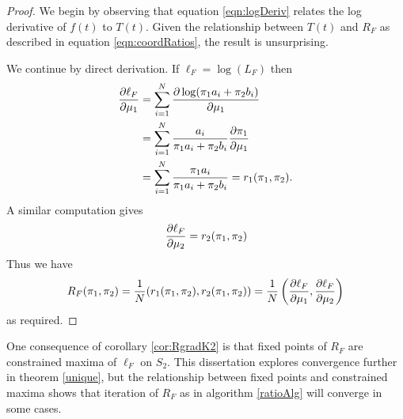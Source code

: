 \begin{proof}
	We begin by observing that equation \eqref{eqn:logDeriv} relates the log derivative of \( f(t) \) to \( T(t) \).  Given the relationship between \( T(t) \) and \( R_F \) as described in equation \eqref{eqn:coordRatios}, the result is unsurprising.
	
	We continue by direct derivation. If \( \ell_F = \log(L_F) \) then 
	\begin{align}\label{eqn:ellDeriv}
		\pdv{\ell_F}{\mu_1} &= \sum_{i=1}^{N} \pdv{\log(\pi_1a_i+\pi_2b_i)}{\mu_1}\nonumber \\
							&= \sum_{i=1}^{N} \frac{a_i}{\pi_1a_i+\pi_2b_i}\pdv{\pi_1}{\mu_1} \\
							&= \sum_{i=1}^{N} \frac{\pi_1a_i}{\pi_1a_i+\pi_2b_i} = r_1(\pi_1,\pi_2).\nonumber
	\end{align}
	A similar computation gives 
	\[\pdv{\ell_F}{\mu_2} = r_2(\pi_1,\pi_2)\]
	Thus we have 
	\begin{equation}\label{eqn:RgradK2}
		R_F(\pi_1,\pi_2) = \frac 1N (r_1(\pi_1,\pi_2),r_2(\pi_1,\pi_2)) = \frac 1N \left(\pdv{\ell_F}{\mu_1} ,\pdv{\ell_F}{\mu_2} \right)
	\end{equation}
	as required.
\end{proof}

One consequence of corollary \ref{cor:RgradK2} is that fixed points of \( R_F \) are constrained maxima of \( \ell_F \) on \(S_2\).  This dissertation explores convergence further in theorem \ref{unique}, but the relationship between fixed points and constrained maxima shows that iteration of \( R_F \) as in algorithm \ref{ratioAlg} will converge in some cases.

